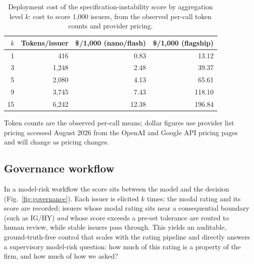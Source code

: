 \documentclass[a4paper,fleqn]{cas-sc}
\begin{document}
\begin{table}[t]\centering
\caption{Deployment cost of the specification-instability score by aggregation level $k$: cost to score
1{,}000 issuers, from the observed per-call token counts and provider pricing.}\label{tab:cost}
\begin{tabular}{rrrr}\toprule
$k$ & Tokens/issuer & \$/1{,}000 (nano/flash) & \$/1{,}000 (flagship) \\\midrule
1 & 416 & 0.83 & 13.12 \\
3 & 1{,}248 & 2.48 & 39.37 \\
5 & 2{,}080 & 4.13 & 65.61 \\
9 & 3{,}745 & 7.43 & 118.10 \\
15 & 6{,}242 & 12.38 & 196.84 \\\bottomrule
\end{tabular}

\vspace{3pt}
{\footnotesize\raggedright Token counts are the observed per-call means; dollar figures use provider list
pricing accessed August 2026 from the OpenAI and Google API pricing pages and will change as pricing
changes.\par}
\end{table}

\subsection{Governance workflow}\label{sec:sis-gov}
In a model-risk workflow the score sits between the model and the decision (Fig.~\ref{fig:governance}).
Each issuer is elicited $k$ times; the modal rating and its score are recorded; issuers whose modal rating
sits near a consequential boundary (such as IG/HY) \emph{and} whose score exceeds a pre-set tolerance are
routed to human review, while stable issuers pass through. This yields an auditable, ground-truth-free
control that scales with the rating pipeline and directly answers a supervisory model-risk question:
how much of this rating is a property of the firm, and how much of how we asked?
\end{document}
